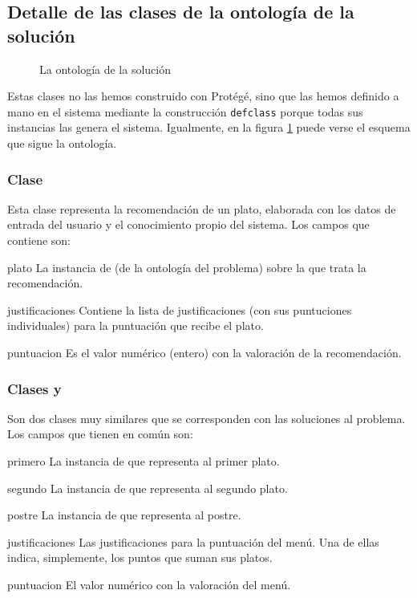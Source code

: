 \subsection{Detalle de las clases de la ontología de la solución}
\begin{figure}[h]
  \caption{La ontología de la solución}\label{ont:solucion}
\end{figure}

Estas clases no las hemos construido con Protégé, sino que las hemos definido a
mano en el sistema mediante la construcción \verb+defclass+ porque todas sus
instancias las genera el sistema. Igualmente, en la figura \ref{ont:solucion}
puede verse el esquema que sigue la ontología.

\subsubsection{Clase }
Esta clase representa la recomendación de un plato, elaborada con los datos de
entrada del usuario y el conocimiento propio del sistema. Los campos que
contiene son:
\begin{slotlist}
\item[plato] La instancia de  (de la ontología del problema) sobre
  la que trata la recomendación.
\item[justificaciones] Contiene la lista de justificaciones (con sus
  puntuciones individuales) para la puntuación que recibe el plato.
\item[puntuacion] Es el valor numérico (entero) con la valoración de la
  recomendación.
\end{slotlist}

\subsubsection{Clases  y }
Son dos clases muy similares que se corresponden con las soluciones al
problema. Los campos que tienen en común son:
\begin{slotlist}
\item[primero] La instancia de  que representa al primer
  plato.
\item[segundo] La instancia de  que representa al segundo
  plato.
\item[postre] La instancia de  que representa al postre.
\item[justificaciones] Las justificaciones para la puntuación del menú. Una de
  ellas indica, simplemente, los puntos que suman sus platos.
\item[puntuacion] El valor numérico con la valoración del menú.
\end{slotlist}

